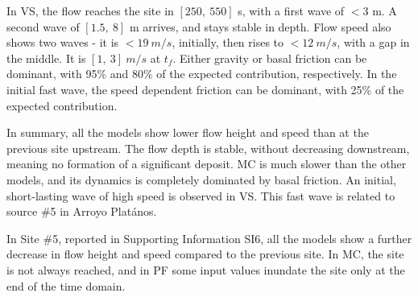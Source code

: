 \documentclass[nhess, manuscript]{copernicus}
\begin{document}
In VS, the flow reaches the site in $[250,\ 550]$ s, with a first wave of $<3$ m. A second wave of $[1.5,\ 8]$ m arrives, and stays stable in depth. Flow speed also shows two waves - it is $<19\ m/s$, initially, then rises to $<12\ m/s$, with a gap in the middle. It is $[1,\ 3]\ m/s$ at $t_f$. Either gravity or basal friction can be dominant, with 95\% and 80\% of the expected contribution, respectively. In the initial fast wave, the speed dependent friction can be dominant, with 25\% of the expected contribution.

In summary, all the models show lower flow height and speed than at the previous site upstream. The flow depth is stable, without decreasing downstream, meaning no formation of a significant deposit. MC is much slower than the other models, and its dynamics is completely dominated by basal friction. An initial, short-lasting wave of high speed is observed in VS. This fast wave is related to source \#5 in Arroyo Plat\'anos.

In Site \#5, reported in Supporting Information SI6, all the models show a further decrease in flow height and speed compared to the previous site. In MC, the site is not always reached, and in PF some input values inundate the site only at the end of the time domain.
\end{document}
